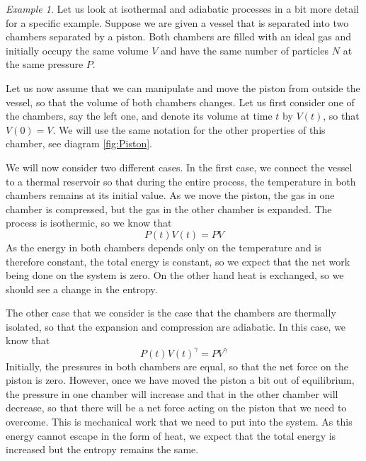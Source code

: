 \documentclass[a4paper, draft]{article}
\theoremstyle{own}
\theoremstyle{remark}
\newtheorem{example}{Example}[section]
\begin{document}
\begin{example}
Let us look at isothermal and adiabatic processes in a bit more detail for a specific example. Suppose we are given a vessel that is separated into two chambers separated by a piston. Both chambers are filled with an ideal gas and initially occupy the same volume $V$ and have the same number of particles $N$ at the same pressure $P$. 

Let us now assume that we can manipulate and move the piston from outside the vessel, so that the volume of both chambers changes. Let us first consider one of the chambers, say the left one, and denote its volume at time $t$ by $V(t)$, so that $V(0) = V$. We will use the same notation for the other properties of this chamber, see diagram \ref{fig:Piston}.

We will now consider two different cases. In the first case, we connect the vessel to a thermal reservoir so that during the entire process, the temperature in both chambers remains at its initial value. As we move the piston, the gas in one chamber is compressed, but the gas in the other chamber is expanded. The process is isothermic, so we know that
$$
P(t)V(t) = PV
$$
As the energy in both chambers depends only on the temperature and is therefore constant, the total energy is constant, so we expect that the net work being done on the system is zero. On the other hand heat is exchanged, so we should see a change in the entropy.

The other case that we consider is the case that the chambers are thermally isolated, so that the expansion and compression are adiabatic. In this case, we know that
$$
P(t)V(t)^\gamma = PV^\gamma
$$
Initially, the pressures in both chambers are equal, so that the net force on the piston is zero. However, once we have moved the piston a bit out of equilibrium, the pressure in one chamber will increase and that in the other chamber will decrease, so that there will be a net force acting on the piston that we need to overcome. This is mechanical work that we need to put into the system. As this energy cannot escape in the form of heat, we expect that the total energy is increased but the entropy remains the same.

\begin{figure}[ht]
\begin{center}
\end{center}
\end{figure}
\end{example}
\end{document}
